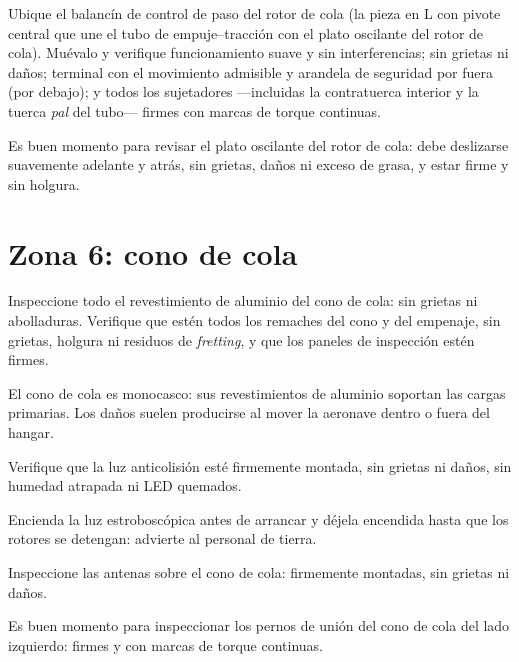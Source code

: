 Ubique el balancín de control de paso del rotor de cola (la pieza en L con pivote central que une el tubo de empuje--tracción con el plato oscilante del rotor de cola). Muévalo y verifique funcionamiento suave y sin interferencias; sin grietas ni daños; terminal con el movimiento admisible y arandela de seguridad por fuera (por debajo); y todos los sujetadores ---incluidas la contratuerca interior y la tuerca \emph{pal} del tubo--- firmes con marcas de torque continuas.

\begin{nota}
Es buen momento para revisar el plato oscilante del rotor de cola: debe deslizarse suavemente adelante y atrás, sin grietas, daños ni exceso de grasa, y estar firme y sin holgura.
\end{nota}

\section{Zona 6: cono de cola}

Inspeccione todo el revestimiento de aluminio del cono de cola: sin grietas ni abolladuras. Verifique que estén todos los remaches del cono y del empenaje, sin grietas, holgura ni residuos de \emph{fretting}, y que los paneles de inspección estén firmes.

\begin{nota}
El cono de cola es monocasco: sus revestimientos de aluminio soportan las cargas primarias. Los daños suelen producirse al mover la aeronave dentro o fuera del hangar.
\end{nota}

Verifique que la luz anticolisión esté firmemente montada, sin grietas ni daños, sin humedad atrapada ni LED quemados.

\begin{nota}
Encienda la luz estroboscópica antes de arrancar y déjela encendida hasta que los rotores se detengan: advierte al personal de tierra.
\end{nota}

Inspeccione las antenas sobre el cono de cola: firmemente montadas, sin grietas ni daños.

\begin{nota}
Es buen momento para inspeccionar los pernos de unión del cono de cola del lado izquierdo: firmes y con marcas de torque continuas.
\end{nota}

